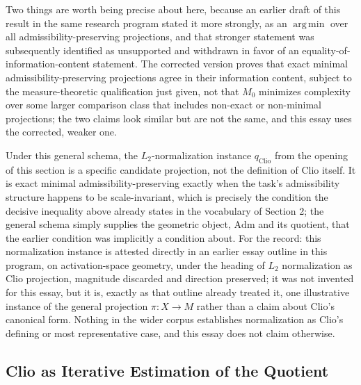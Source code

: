 \documentclass[11pt]{article}
\DeclareMathOperator*{\argmin}{arg\,min}
\begin{document}
Two things are worth being precise about here, because an earlier draft of this result in the same research program stated it more strongly, as an $\argmin$ over all admissibility-preserving projections, and that stronger statement was subsequently identified as unsupported and withdrawn in favor of an equality-of-information-content statement. The corrected version proves that exact minimal admissibility-preserving projections agree in their information content, subject to the measure-theoretic qualification just given, not that $M_0$ minimizes complexity over some larger comparison class that includes non-exact or non-minimal projections; the two claims look similar but are not the same, and this essay uses the corrected, weaker one.

Under this general schema, the $L_2$-normalization instance $q_{\mathrm{Clio}}$ from the opening of this section is a specific candidate projection, not the definition of Clio itself. It is exact minimal admissibility-preserving exactly when the task's admissibility structure happens to be scale-invariant, which is precisely the condition the decisive inequality above already states in the vocabulary of Section 2; the general schema simply supplies the geometric object, $\mathrm{Adm}$ and its quotient, that the earlier condition was implicitly a condition about. For the record: this normalization instance is attested directly in an earlier essay outline in this program, on activation-space geometry, under the heading of $L_2$ normalization as Clio projection, magnitude discarded and direction preserved; it was not invented for this essay, but it is, exactly as that outline already treated it, one illustrative instance of the general projection $\pi: X \to M$ rather than a claim about Clio's canonical form. Nothing in the wider corpus establishes normalization as Clio's defining or most representative case, and this essay does not claim otherwise.

\subsection{Clio as Iterative Estimation of the Quotient}
\end{document}
